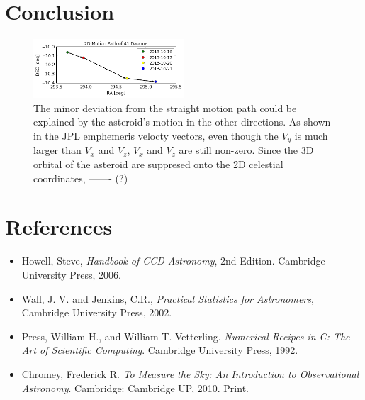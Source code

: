 \documentclass[authoryear, 12pt,5p, times]{elsarticle}
\begin{document}
\section{Conclusion}
\begin{figure}[h!]
\includegraphics[width=0.5\textwidth]{figures/motion_path}
\caption{The minor deviation from the straight motion path could be explained by the asteroid's motion in the other directions. As shown in the JPL emphemeris velocty vectors, even though the $V_y$ is much larger than $V_x$ and $V_z$, $V_x$ and $V_z$ are still non-zero. Since the 3D orbital of the asteroid are suppresed onto the 2D celestial coordinates, ------- (?)}
\label{motion_path}
\end{figure}
 \section{References}
%
\begin{itemize}
\item Howell, Steve,  \textit{Handbook of CCD Astronomy}, 2nd Edition. Cambridge University Press, 2006.
\item Wall, J. V. and Jenkins, C.R., \textit{Practical Statistics for Astronomers}, Cambridge University Press, 2002.
\item Press, William H., and William T. Vetterling. \textit{Numerical Recipes in C: The Art of Scientific Computing}. Cambridge University Press, 1992. 
\item Chromey, Frederick R. \textit{To Measure the Sky: An Introduction to Observational Astronomy}. Cambridge: Cambridge UP, 2010. Print.
\end{itemize}
\end{document}
